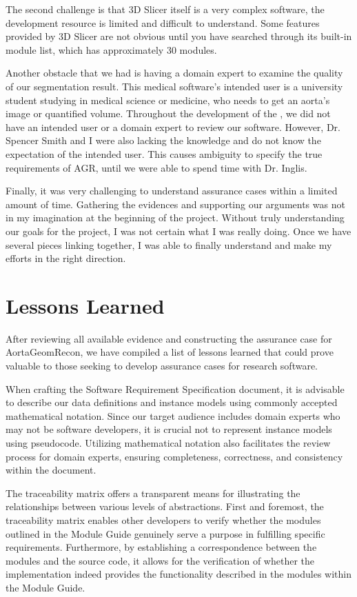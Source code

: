 The second challenge is that 3D Slicer itself is a very complex software, the development resource is limited and difficult to understand. Some features provided by 3D Slicer are not obvious until you have searched through its built-in module list, which has approximately 30 modules.

Another obstacle that we had is having a domain expert to examine the quality of our segmentation result. This medical software's intended user is a university student studying in medical science or medicine, who needs to get an aorta's image or quantified volume. Throughout the development of the \progname{}, we did not have an intended user or a domain expert to review our software. However, Dr. Spencer Smith and I were also lacking the knowledge and do not know the expectation of the intended user. This causes ambiguity to specify the true requirements of AGR, until we were able to spend time with Dr. Inglis.

Finally, it was very challenging to understand assurance cases within a limited amount of time. Gathering the evidences and supporting our arguments was not in my imagination at the beginning of the project. Without truly understanding our goals for the project, I was not certain what I was really doing. Once we have several pieces linking together, I was able to finally understand and make my efforts in the right direction. 

\section{Lessons Learned}\label{ll}
After reviewing all available evidence and constructing the assurance case for AortaGeomRecon, we have compiled a list of lessons learned that could prove valuable to those seeking to develop assurance cases for research software.

When crafting the Software Requirement Specification document, it is advisable to describe our data definitions and instance models using commonly accepted mathematical notation. Since our target audience includes domain experts who may not be software developers, it is crucial not to represent instance models using pseudocode. Utilizing mathematical notation also facilitates the review process for domain experts, ensuring completeness, correctness, and consistency within the document.

The traceability matrix offers a transparent means for illustrating the relationships between various levels of abstractions. First and foremost, the traceability matrix enables other developers to verify whether the modules outlined in the Module Guide genuinely serve a purpose in fulfilling specific requirements. Furthermore, by establishing a correspondence between the modules and the source code, it allows for the verification of whether the implementation indeed provides the functionality described in the modules within the Module Guide.

